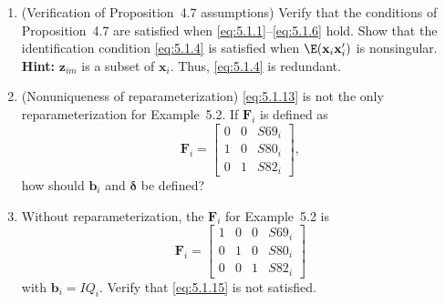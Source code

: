 \begin{enumerate}
\item (Verification of Proposition~4.7 assumptions)\quad
  Verify that the conditions of
  Proposition~4.7 are satisfied when \eqref{eq:5.1.1}--\eqref{eq:5.1.6} hold. Show that the identification
  condition \eqref{eq:5.1.4} is satisfied when $\E(\mathbf{x}_i\mathbf{x}_i')$ is nonsingular.
  \textbf{Hint:} $\mathbf{z}_{im}$ is a subset of $\mathbf{x}_i$. Thus, \eqref{eq:5.1.4} is redundant.

\item (Nonuniqueness of reparameterization)\quad
  \eqref{eq:5.1.13} is not the only reparameterization
  for Example~5.2. If $\mathbf{F}_i$ is defined as
  \[
    \mathbf{F}_i = \begin{bmatrix}
      0 & 0 & S69_i \\
      1 & 0 & S80_i \\
      0 & 1 & S82_i
    \end{bmatrix},
  \]
  how should $\mathbf{b}_i$ and $\boldsymbol{\delta}$ be defined?

\item Without reparameterization, the $\mathbf{F}_i$ for Example~5.2 is
  \[
    \mathbf{F}_i = \begin{bmatrix}
      1 & 0 & 0 & S69_i \\
      0 & 1 & 0 & S80_i \\
      0 & 0 & 1 & S82_i
    \end{bmatrix}
  \]
  with $\mathbf{b}_i = IQ_i$. Verify that \eqref{eq:5.1.15} is not satisfied.
\end{enumerate}
